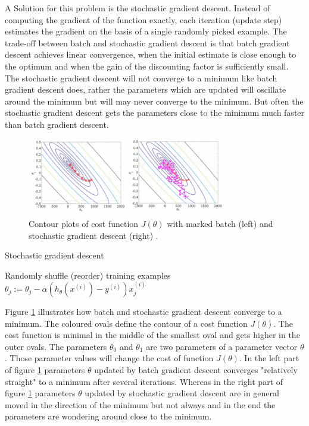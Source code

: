 \documentclass[conference]{IEEEtran}
\begin{document}
A Solution for this problem is the stochastic gradient descent. Instead of computing the gradient of the function exactly, each iteration (update step) estimates the gradient on the basis of a single randomly picked example. The trade-off between batch and stochastic gradient descent is that batch gradient descent achieves linear convergence, when the initial estimate is close enough to the optimum and when the gain of the discounting factor is sufficiently small. The stochastic gradient descent will not converge to a minimum like batch gradient descent does, rather the parameters which are updated will oscillate around the minimum but will may never converge to the minimum. But often the stochastic gradient descent gets the parameters close to the minimum much faster than batch gradient descent. \\

\begin{figure}[!t]
\centering
\includegraphics[width=3.5in]{gradient_plots}
\caption{Contour plots of cost function $J(\theta)$ with marked batch (left) and stochastic gradient descent (right) \cite{ng_2017}.}
\label{fig:gradient_plots}
\end{figure}

\begin{algorithm}
\caption{Stochastic gradient descent \cite{ng_2017}} \label{alg:stochastic gradient descent}
\begin{algorithmic}
\STATE Randomly shuffle (reorder) training examples
\REPEAT
{}
	\STATE $\theta_j := \theta_j - \alpha (h_\theta(x^{(i)}) - y^{(i)}) x^{(i)}_j$
	\ENDFOR
\ENDFOR
{}


\end{algorithmic}
\end{algorithm}

Figure \ref{fig:gradient_plots} illustrates how batch and stochastic gradient descent converge to a minimum. The coloured ovals define the contour of a cost function $J(\theta)$. The cost function is minimal in the middle of the smallest oval and gets higher in the outer ovals. The parameters $\theta_0$ and $\theta_1$ are two parameters of a parameter vector $\theta$. Those parameter values will change the cost of function $J(\theta)$. In the left part of figure \ref{fig:gradient_plots} parameters $\theta$ updated by batch gradient descent converges "relatively straight" to a minimum after several iterations. Whereas in the right part of figure \ref{fig:gradient_plots} parameters $\theta$ updated by stochastic gradient descent are in general moved in the direction of the minimum but not always and in the end the parameters are wondering around close to the minimum.
\end{document}
